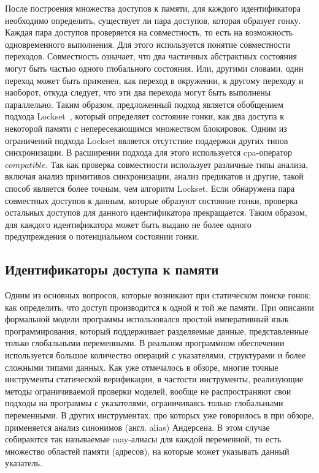 После построения множества доступов к памяти, для каждого идентификатора необходимо определить, существует ли пара доступов, которая образует гонку.
Каждая пара доступов проверяется на совместность, то есть на возможность одновременного выполнения.
Для этого используется понятие совместности переходов. Совместность означает, что два частичных абстрактных состояния могут быть частью одного глобального состояния.
Или, другими словами, один переход может быть применен, как переход в окружении, к другому переходу и наоборот, откуда следует, что эти два перехода могут быть выполнены параллельно.
Таким образом, предложенный подход является обобщением подхода Lockset~\cite{eraser97}, который определяет состояние гонки, как два доступа к некоторой памяти с непересекающимся множеством блокировок.
Одним из ограничений подхода Lockset является отсутствие поддержки других типов синхронизации.
В расширении подхода для этого используется cpa-оператор $compatible$. 
Так как проверка совместности использует различные типы анализа, включая анализ примитивов синхронизации, анализ предикатов и другие, такой способ является более точным, чем алгоритм Lockset.
Если обнаружена пара совместных доступов к данным, которые образуют состояние гонки, проверка остальных доступов для данного идентификатора прекращается.
Таким образом, для каждого идентификатора может быть выдано не более одного предупреждения о потенциальном состоянии гонки.

\subsection{Идентификаторы доступа к памяти}
\label{subsect_impl_identifiers}

Одним из основных вопросов, которые возникают при статическом поиске гонок: как определить, что доступ производится к одной и той же памяти.
При описании формальной модели программы использовался простой императивный язык программирования, который поддерживает разделяемые данные, представленные только глобальными переменными.
В реальном программном обеспечении используется большое количество операций с указателями, структурами и более сложными типами данных.
Как уже отмечалось в обзоре, многие точные инструменты статической верификации, в частости инструменты, реализующие методы ограничиваемой проверки моделей, вообще не распространяют свои подходы на программы с указателями, ограничиваясь только глобальными переменными.
В других инструментах, про которых уже говорилось в при обзоре, применяется анализ синонимов (англ. alias) Андерсена.
В этом случае собираются так называемые may-алиасы для каждой переменной, то есть множество областей памяти (адресов), на которые может указывать данный указатель.

